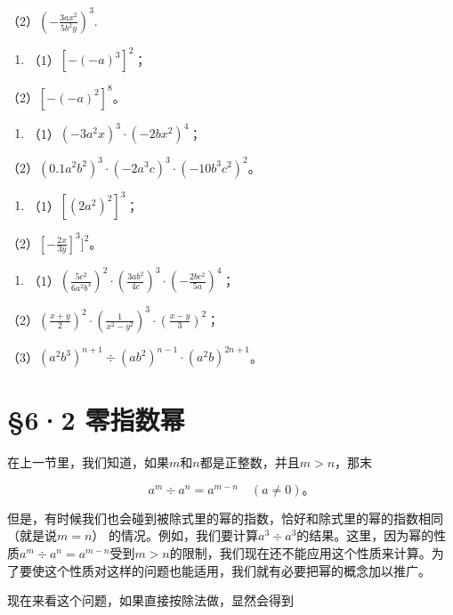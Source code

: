 （2）\(\left(-\frac{3ax^2}{5b^2y}\right)^3.\)

\begin{enumerate}[start=8]
\item
  （1）\([-(-a)^{3}]^{2}\)；
\end{enumerate}

（2）\([-(-a)^{2}]^{8}\)。

\begin{enumerate}[start=4]
\item
  （1）\((-3a^{2}x)^{3} \cdot (-2bx^{2})^{4}\)；
\end{enumerate}

（2）\((0.1a^{2}b^{2})^{3} \cdot (-2a^{3}c)^{3} \cdot (-10b^{3}c^{2})^{2}\)。

\begin{enumerate}[start=5]
\item
  （1）\(\left[(2a^2)^2\right]^3\)；
\end{enumerate}

（2）\(\left[-\frac{2x}{3y}\right]^3]^2\)。

\begin{enumerate}[start=6]
\item
  （1）\(\left(\frac{5c^2}{6a^2b^3}\right)^2 \cdot \left(\frac{3ab^2}{4c}\right)^3 \cdot \left(-\frac{2bc^2}{5a}\right)^4\)；
\end{enumerate}

（2）\(\left(\frac{x + y}{2}\right)^2 \cdot \left(\frac{1}{x^2 - y^2}\right)^3 \cdot \left(\frac{x - y}{3}\right)^2\)；

（3）\((a^{2}b^{3})^{n + 1}\div (ab^{2})^{n - 1}\cdot (a^{2}b)^{2n + 1}\)。

\section{§6·2 零指数幂}

在上一节里，我们知道，如果\(m\)和\(n\)都是正整数，并且\(m > n\)，那末

\[
a ^ {m} \div a ^ {n} = a ^ {m - n} \quad (a \neq 0)\text{。}
\]

但是，有时候我们也会碰到被除式里的幂的指数，恰好和除式里的幂的指数相同
（就是说\(m = n\)）
的情况。例如，我们要计算\(a^3 \div a^3\)的结果。这里，因为幂的性质\(a^m \div a^n = a^{m-n}\)受到\(m > n\)的限制，我们现在还不能应用这个性质来计算。为了要使这个性质对这样的问题也能适用，我们就有必要把幂的概念加以推广。

现在来看这个问题，如果直接按除法做，显然会得到

